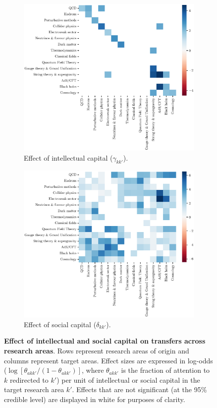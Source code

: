 \documentclass{article}
\begin{document}
\begin{figure}[h]
\hspace{-2em}
\begin{subfigure}{.5\textwidth}
    \includegraphics[width=1\textwidth]{Fig9a}
    \caption{Effect of intellectual capital ($\gamma_{kk'}$).}
    \label{fig:intellectual-capital-effect}
\end{subfigure}%
\begin{subfigure}{.5\textwidth}
    \includegraphics[width=1\textwidth]{Fig9b}
    \caption{Effect of social capital ($\delta_{kk'}$).}
    \label{fig:social-capital-effect}
\end{subfigure}
\caption{\textbf{Effect of intellectual and social capital on transfers across research areas}. Rows represent research areas of origin and columns represent target areas. Effect sizes are expressed in log-odds ($\log {[\theta_{akk'}/(1-\theta_{akk'})]}$, where $\theta_{akk'}$ is the fraction of attention to $k$ redirected to $k'$) per unit of intellectual or social capital in the target research area $k'$. Effects that are not significant (at the 95\% credible level) are displayed in white for purposes of clarity.}
\label{fig:test}
\end{figure}
\end{document}
